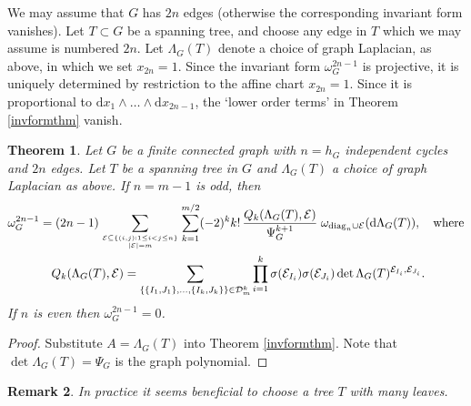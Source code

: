 \documentclass[10pt]{amsart}
\newcommand{\dd}{\mathrm{d}}
\newcommand{\sE}{\mathcal{E}}
\newcommand{\diag}{\mathrm{diag}}
\theoremstyle{plain}
\newtheorem{thm}{Theorem}
\newtheorem{remark}[thm]{Remark}
\newcommand{\0}{\color{blue}{\mathsf{0}}}
\begin{document}
We may assume that $G$ has $2n$ edges (otherwise the  corresponding  invariant form vanishes).  
Let  $T\subset G$ be a spanning tree, and choose any edge in $T$ which we may assume is numbered $2n$. Let $\Lambda_G(T)$ denote a choice of graph Laplacian, as above, in which we set $x_{2n}=1$. Since the invariant form $\omega^{2n-1}_G$ is projective, it is uniquely determined by restriction to the affine chart $x_{2n}=1$. Since it is proportional to 
  $\dd x_{1}\wedge \ldots \wedge \dd x_{2n-1}$,  the  `lower order terms'  in Theorem \ref{invformthm} vanish. 


\begin{thm}\label{Qdefthm}
Let $G$ be a finite connected graph with $n=h_G$ independent cycles and $2n$ edges. Let $T$ be a spanning tree in $G$ and $\Lambda_G(T)$ a choice of graph Laplacian as above.  If $n=m-1$ is odd, then
\begin{align}\label{formula2}
\omega_G^{2n-1}&=(2n-1)\sum_{\genfrac{}{}{0pt}{}{\sE\subseteq\{(i,j): 1\leq i<j\leq n\}}{|\sE|=m}}\sum_{k=1}^{m/2}  (-2)^k k!\, \frac{ Q_k(\Lambda_G(T),\sE)}{\Psi_G^{k+1}}\;\omega_{\diag_n \cup \sE} (\dd\Lambda_G(T)),\quad\text{where}\nonumber\\
&\quad
Q_k(\Lambda_G(T),\sE)= \sum_{  \{\{I_1,J_1\} , \ldots, \{ I_k, J_k\} \} \in \mathcal{D}^k_{m}  }  \prod_{i=1}^k\sigma(\sE_{I_i})\sigma(\sE_{J_i})\det \Lambda_G(T)^{\sE_{I_i},\sE_{J_i}}.
\end{align}
If $n$ is even then  $\omega_G^{2n-1}=0$.
\end{thm}
\begin{proof}
Substitute $A = \Lambda_G(T)$ into  Theorem \ref{invformthm}. Note that $\det\Lambda_G(T)=\Psi_G$ is the graph polynomial.
\end{proof}

 \begin{remark}
In practice it seems  beneficial to choose a tree $T$ with many leaves. 
 \end{remark}
\end{document}

